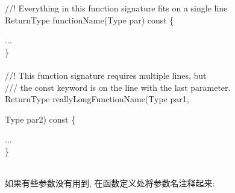 \documentclass[a4paper,11pt,CJK]{article}
\begin{document}
\begin{CJK}{UTF8}{gbsn}
{\begin{minipage}{400pt}
\indent //! Everything in this function signature fits on a single line\\
\indent ReturnType functionName(Type par) const \{\par
\hspace{3ex}   ...\\
\indent \}\\
\indent \\
\indent //! This function signature requires multiple lines, but\\
\indent /// the const keyword is on the line with the last parameter.\\
\indent ReturnType reallyLongFunctionName(Type par1,\par
\hspace{16ex}                                   Type par2) const \{\par
\hspace{3ex}   ...\\
\indent \}\\
\end{minipage}
}
\\
如果有些参数没有用到, 在函数定义处将参数名注释起来:\\
\\
\\
\begin{table}[htbp]

\end{table}
\end{CJK}
\end{document}
